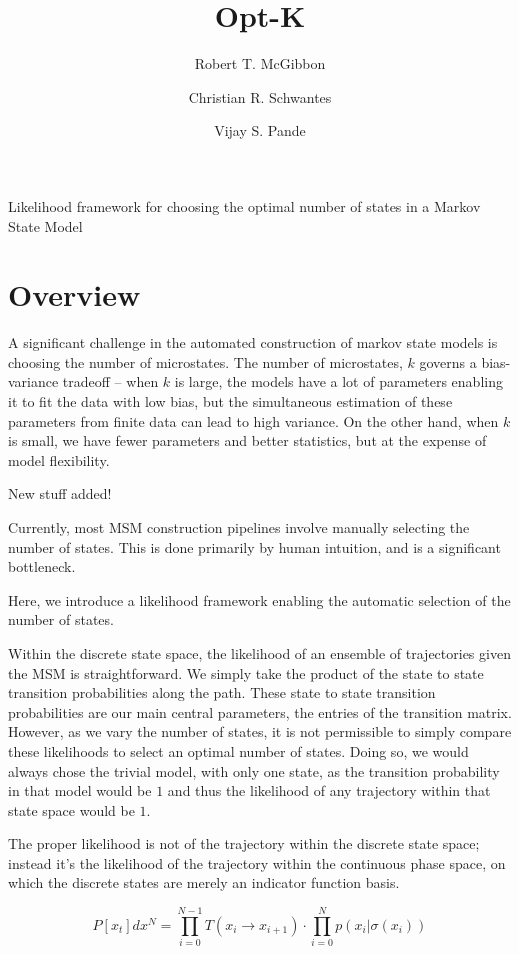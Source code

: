 \documentclass[twocolumn,floatfix,nofootinbib,aps]{revtex4-1}
\begin{document}
\title{Opt-K}
\author{Robert T. McGibbon}
\author{Christian R. Schwantes}
\author{Vijay S. Pande}
\maketitle

Likelihood framework for choosing the optimal number of states in a
Markov State Model

\section{Overview}

A significant challenge in the automated construction of markov state
models is choosing the number of microstates. The number of microstates,
$k$ governs a bias-variance tradeoff -- when $k$ is large, the models
have a lot of parameters enabling it to fit the data with low bias, but
the simultaneous estimation of these parameters from finite data can
lead to high variance. On the other hand, when $k$ is small, we have
fewer parameters and better statistics, but at the expense of model
flexibility.

New stuff added!

Currently, most MSM construction pipelines involve manually selecting
the number of states. This is done primarily by human intuition, and is
a significant bottleneck.

Here, we introduce a likelihood framework enabling the automatic
selection of the number of states.

Within the discrete state space, the likelihood of an ensemble of
trajectories given the MSM is straightforward. We simply take the
product of the state to state transition probabilities along the path.
These state to state transition probabilities are our main central
parameters, the entries of the transition matrix. However, as we vary
the number of states, it is not permissible to simply compare these
likelihoods to select an optimal number of states. Doing so, we would
always chose the trivial model, with only one state, as the transition
probability in that model would be $1$ and thus the likelihood of any
trajectory within that state space would be $1$.

The proper likelihood is not of the trajectory within the discrete state
space; instead it's the likelihood of the trajectory within the
continuous phase space, on which the discrete states are merely an
indicator function basis. 

$$ 
P[x_t] dx^N = \prod_{i=0}^{N-1} T(x_i \rightarrow x_{i+1}) \cdot \prod_{i=0}^{N} p(x_{i} | \sigma(x_{i}))
$$
\end{document}

